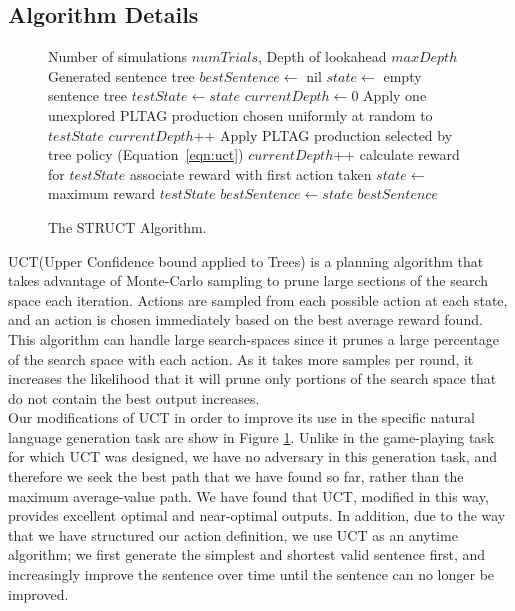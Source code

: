 \subsection{Algorithm Details}
\begin{figure}
\caption{The STRUCT Algorithm.}\label{uct-code}
\begin{algorithmic}[1]
\REQUIRE Number of simulations $numTrials$, Depth of lookahead $maxDepth$
\ENSURE Generated sentence tree
\STATE $bestSentence \gets$ nil
\STATE $state \gets$ empty sentence tree
		\STATE $testState \gets state$
		\STATE $currentDepth \gets 0$
			\STATE Apply one unexplored PLTAG production chosen
                        uniformly at random to $testState$
			\STATE $currentDepth$++
		\ENDIF
			\STATE Apply PLTAG production selected by tree
                        policy (Equation~\ref{eqn:uct})
			\STATE $currentDepth$++
		\ENDWHILE
		\STATE calculate reward for $testState$
		\STATE associate reward with first action taken
	\ENDFOR
	\STATE $state \gets$ maximum reward $testState$
		\STATE $bestSentence \gets state$
	\ENDIF
\ENDWHILE
\ENDWHILE
\RETURN $bestSentence$
\end{algorithmic}
\end{figure}

UCT(Upper Confidence bound applied to Trees) \cite{kocsis_bandit_2006} is a planning algorithm that takes advantage of
Monte-Carlo sampling to prune large sections of the search space each iteration. Actions are sampled from each possible
action at each state, and an action is chosen immediately based on the best average reward found. This algorithm can
handle large search-spaces since it prunes a large percentage of the search space with each action. As it takes more
samples per round, it increases the likelihood that it will prune only portions of the search space that do not contain
the best output increases.\\

Our modifications of UCT in order to improve its use in the specific natural language generation task are show in Figure
\ref{uct-code}. Unlike in the game-playing task for which UCT was designed, we have no adversary in this generation
task, and therefore we seek the best path that we have found so far, rather than the maximum average-value path. We have
found that UCT, modified in this way, provides excellent optimal and near-optimal outputs. In addition, due to the way
that we have structured our action definition, we use UCT as an anytime algorithm; we first generate the simplest and
shortest valid sentence first, and increasingly improve the sentence over time until the sentence can no longer be
improved.\\

